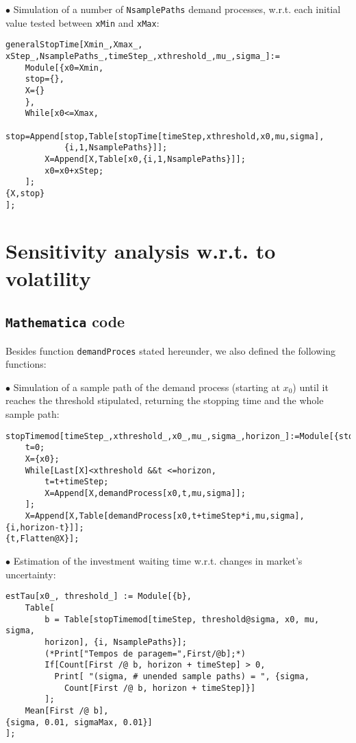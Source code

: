 \vspace{3mm}
$\bullet$ Simulation of a number of \texttt{NsamplePaths} demand processes, w.r.t. each initial value tested between \texttt{xMin} and \texttt{xMax}:
\begin{lstlisting}
generalStopTime[Xmin_,Xmax_, xStep_,NsamplePaths_,timeStep_,xthreshold_,mu_,sigma_]:=
	Module[{x0=Xmin,
	stop={},
	X={}
	},
	While[x0<=Xmax,
		stop=Append[stop,Table[stopTime[timeStep,xthreshold,x0,mu,sigma],
			{i,1,NsamplePaths}]];
		X=Append[X,Table[x0,{i,1,NsamplePaths}]];
		x0=x0+xStep;
	];
{X,stop}
];
\end{lstlisting}


\section{Sensitivity analysis w.r.t. to volatility}
\label{section:sav}
\subsection{\texttt{Mathematica} code}
Besides function \texttt{demandProces} stated hereunder, we also defined the following functions:

\vspace{3mm}
$\bullet$ Simulation of a sample path of the demand process (starting at $x_0$) until it reaches the threshold stipulated, returning the stopping time and the whole sample path:
\begin{lstlisting}
stopTimemod[timeStep_,xthreshold_,x0_,mu_,sigma_,horizon_]:=Module[{stop,t,X},
	t=0;
	X={x0};
	While[Last[X]<xthreshold &&t <=horizon,
		t=t+timeStep;
		X=Append[X,demandProcess[x0,t,mu,sigma]];
	];
	X=Append[X,Table[demandProcess[x0,t+timeStep*i,mu,sigma],{i,horizon-t}]];
{t,Flatten@X}];
\end{lstlisting}


\vspace{3mm}
$\bullet$ Estimation of the investment waiting time w.r.t. changes in market's uncertainty:
\begin{lstlisting}
estTau[x0_, threshold_] := Module[{b},
	Table[
		b = Table[stopTimemod[timeStep, threshold@sigma, x0, mu, sigma,
		horizon], {i, NsamplePaths}];
		(*Print["Tempos de paragem=",First/@b];*)
		If[Count[First /@ b, horizon + timeStep] > 0,
		  Print[ "(sigma, # unended sample paths) = ", {sigma, 
		    Count[First /@ b, horizon + timeStep]}]
		];
	Mean[First /@ b],
{sigma, 0.01, sigmaMax, 0.01}]
];
\end{lstlisting}


